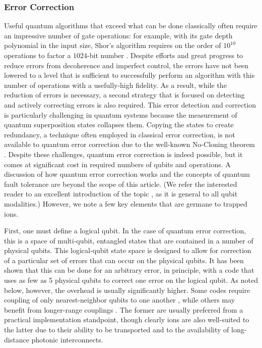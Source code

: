 \documentclass[%
12pt,
 amsmath,amssymb,
]{revtex4-2}
\begin{document}
    \subsubsection{Error Correction}
    \label{ErrorCorrection}
Useful quantum algorithms that exceed what can be done classically often require an impressive number of gate operations: for example, with its gate depth polynomial in the input size, Shor's algorithm requires on the order of $10^{10}$ operations to factor a $1024$-bit number \cite{BeckmanEfficient1996}. Despite efforts and great progress to reduce errors from decoherence and imperfect control, the errors have not been lowered to a level that is sufficient to successfully perform an algorithm with this number of operations with a usefully-high fidelity.  As a result, while the reduction of errors is necessary, a second strategy that is focused on detecting and actively correcting errors is also required.  This error detection and correction is particularly challenging in quantum systems because the measurement of quantum superposition states collapses them.  Copying the states to create redundancy, a technique often employed in classical error correction, is not available to quantum error correction due to the well-known No-Cloning theorem \cite{WoottersNoCloning1982,DieksNoCloning1982}.  Despite these challenges, quantum error correction is indeed possible, but it comes at significant cost in required numbers of qubits and operations.  A discussion of how quantum error correction works and the concepts of quantum fault tolerance are beyond the scope of this article. (We refer the interested reader to an excellent introduction of the topic \cite{GottesmanQEC2009}, as it is general to all qubit modalities.)  However, we note a few key elements that are germane to trapped ions.

First, one must define a logical qubit. In the case of quantum error correction, this is a space of multi-qubit, entangled states that are contained in a number of physical qubits.  This logical-qubit state space is designed to allow for correction of a particular set of errors that can occur on the physical qubits.   It has been shown that this can be done for an arbitrary error, in principle, with a code that uses as few as 5 physical qubits \cite{KnillQEC1997} to correct one error on the logical qubit.  As noted below, however, the overhead is usually significantly higher.  Some codes require coupling of only nearest-neighbor qubits to one another \cite{BravyiKitaevSurfaceCode1998, FowlerSurfaceCode2012}, while others may benefit from longer-range couplings \cite{SvoreFTThresholds2006}.  The former are usually preferred from a practical implementation standpoint, though clearly ions are also well-suited to the latter due to their ability to be transported and to the availability of long-distance photonic interconnects.
\end{document}
